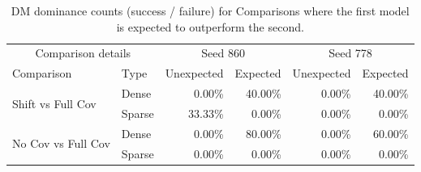 \begin{table}
\caption{DM dominance counts (success / failure) for Comparisons where the first model is expected to outperform the second.}
\begin{tabular}{llrrrr}
\toprule
\multicolumn{2}{c}{Comparison details} & \multicolumn{2}{c}{Seed 860} & \multicolumn{2}{c}{Seed 778} \\
\cmidrule(lr){1-2}\cmidrule(lr){3-4}\cmidrule(lr){5-6}
Comparison & Type & Unexpected & Expected & Unexpected & Expected \\
\midrule
\multirow[t]{2}{*}{Shift vs Full Cov} & Dense & 0.00\% & 40.00\% & 0.00\% & 40.00\% \\
 & Sparse & 33.33\% & 0.00\% & 0.00\% & 0.00\% \\
\cline{1-6}
\multirow[t]{2}{*}{No Cov vs Full Cov} & Dense & 0.00\% & 80.00\% & 0.00\% & 60.00\% \\
 & Sparse & 0.00\% & 0.00\% & 0.00\% & 0.00\% \\
\cline{1-6}
\bottomrule
\end{tabular}
\end{table}
